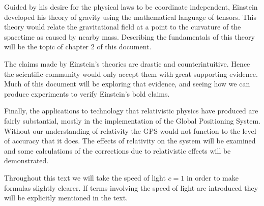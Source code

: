 Guided by his desire for the physical laws to be coordinate independent, Einstein developed his theory of gravity using the mathematical language of tensors. This theory would relate the gravitational field at a point to the curvature of the spacetime as caused by nearby mass. Describing the fundamentals of this theory will be the topic of chapter 2 of this document.

The claims made by Einstein's theories are drastic and counterintuitive. Hence the scientific community would only accept them with great supporting evidence. Much of this document will be exploring that evidence, and seeing how we can produce experiments to verify Einstein's bold claims.

Finally, the applications to technology that relativistic physics have produced are fairly substantial, mostly in the implementation of the Global Positioning System. Without our understanding of relativity the GPS would not function to the level of accuracy that it does. The effects of relativity on the system will be examined and some calculations of the corrections due to relativistic effects will be demonstrated.

Throughout this text we will take the speed of light \(c = 1\) in order to make formulas slightly clearer. If terms involving the speed of light are introduced they will be explicitly mentioned in the text.  